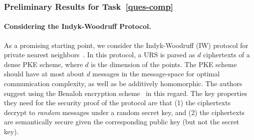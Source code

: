 \subsubsection{Preliminary Results for Task~\ref{ques-comp}}



\paragraph*{Considering the Indyk-Woodruff Protocol.}  
As a promising starting point, we consider the Indyk-Woodruff (IW) protocol for private nearest neighbors~\cite{TCC:IndWoo06}.  In this protocol, a URS is parsed as $d$ ciphertexts of a dense PKE scheme, where $d$ is the dimension of the points.  The PKE scheme should have at most about $d$ messages in the message-space for optimal communication complexity, as well as be additively homomorphic.  The authors suggest using the Benaloh encryption scheme~\cite{SAC:Benaloh94} in this regard.  The key properties they need for the security proof of the protocol are that (1) the ciphertexts decrypt to \emph{random} messages under a random secret key, and  (2) the ciphertexts are semantically secure given the corresponding public key (but not the secret key).  


